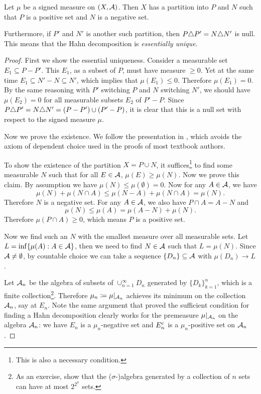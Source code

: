\begin{namedthm} \label{thm:hahn-decomp}
    Let $\mu$ be a signed measure on $(X,\mathcal{A})$. Then $X$ has a partition into $P$ and $N$ such that $P$ is a positive set and $N$ is a negative set.

    Furthermore, if $P'$ and $N'$ is another such partition, then $P \triangle P' = N \triangle N'$ is null. This means that the Hahn decomposition is \emph{essentially unique}.
\end{namedthm}
\begin{proof}
    First we show the essential uniqueness. Consider a measurable set $E_1 \subseteq P - P'$. This $E_1$, as a subset of $P$, must have measure $\geq 0$. Yet at the same time $E_1 \subseteq N' - N\subseteq N'$, which implies that $\mu(E_1)\leq 0$. Therefore $\mu(E_1) = 0$. By the same reasoning with $P'$ switching $P$ and $N$ switching $N'$, we should have $\mu(E_2) = 0$ for all measurable subsets $E_2$ of $P'-P$. Since $P\triangle P' = N \triangle N' = (P - P')\cup(P' - P)$, it is clear that this is a null set with respect to the signed measure $\mu$.

    Now we prove the existence. We follow the presentation in \cite{Falkner_2019}, which avoids the axiom of dependent choice used in the proofs of most textbook authors.

    To show the existence of the partition $X = P \cup N$, it suffices\footnote{This is also a necessary condition.} to find some measurable $N$ such that for all $E \in \mathcal{A}$, $\mu(E)\geq \mu(N)$. Now we prove this claim. By assumption we have $\mu(N)\leq \mu(\emptyset) = 0$. Now for any $A \in \mathcal{A}$, we have \[
        \mu(N) + \mu(N\cap A) \leq \mu(N-A) + \mu(N\cap A) = \mu(N).
    \] Therefore $N$ is a negative set. For any $A \in \mathcal{A}$, we also have $P\cap A = A - N$ and \[
        \mu(N) \leq \mu(A) = \mu(A - N) + \mu(N).
    \] Therefore $\mu(P\cap A)\geq 0$, which means $P$ is a positive set.
    
    Now we find such an $N$ with the smallest measure over all measurable sets. Let $L = \inf\{\mu(A): A\in \mathcal{A}\}$, then we need to find $N \in \mathcal{A}$ such that $L = \mu(N)$. Since $\mathcal{A} \neq \emptyset$, by countable choice we can take a sequence $\{D_n\}\subseteq \mathcal{A}$ with $\mu(D_n)\to L$.

    Let $\mathcal{A}_n$ be the algebra of subsets of $\cup_{n=1}^\infty D_n$ generated by $\{D_k\}_{k=1}^n$, which is a finite collection\footnote{As an exercise, show that the ($\sigma$-)algebra generated by a collection of $n$ sets can have at most $2^{2^n}$ sets.}. Therefore $\mu_n \coloneqq \mu|_{\mathcal{A}_n}$ achieves its minimum on the collection $\mathcal{A}_n$, say at $E_n$. Note the same argument that proved the sufficient condition for finding a Hahn decomposition clearly works for the premeasure $\mu|_{\mathcal{A}_n}$ on the algebra $\mathcal{A}_n$: we have $E_n$ is a $\mu_n$-negative set and $E_n^{\mathrm{c}}$ is a $\mu_n$-positive set on $\mathcal{A}_n$.


\end{proof}
